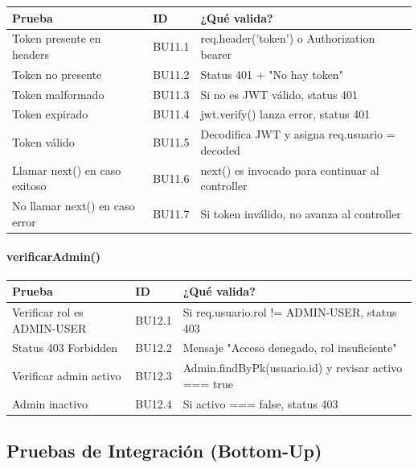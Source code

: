 \begin{table}[H]
\centering
\begin{tabular}{|l|l|p{6cm}|}
\hline
\textbf{Prueba} & \textbf{ID} & \textbf{¿Qué valida?} \\ \hline
Token presente en headers & BU11.1 & req.header('token') o Authorization bearer \\ \hline
Token no presente & BU11.2 & Status 401 + "No hay token" \\ \hline
Token malformado & BU11.3 & Si no es JWT válido, status 401 \\ \hline
Token expirado & BU11.4 & jwt.verify() lanza error, status 401 \\ \hline
Token válido & BU11.5 & Decodifica JWT y asigna req.usuario = decoded \\ \hline
Llamar next() en caso exitoso & BU11.6 & next() es invocado para continuar al controller \\ \hline
No llamar next() en caso error & BU11.7 & Si token inválido, no avanza al controller \\ \hline
\end{tabular}
\end{table}

\paragraph{verificarAdmin()}

\begin{table}[H]
\centering
\begin{tabular}{|l|l|p{6cm}|}
\hline
\textbf{Prueba} & \textbf{ID} & \textbf{¿Qué valida?} \\ \hline
Verificar rol es ADMIN-USER & BU12.1 & Si req.usuario.rol != ADMIN-USER, status 403 \\ \hline
Status 403 Forbidden & BU12.2 & Mensaje "Acceso denegado, rol insuficiente" \\ \hline
Verificar admin activo & BU12.3 & Admin.findByPk(usuario.id) y revisar activo === true \\ \hline
Admin inactivo & BU12.4 & Si activo === false, status 403 \\ \hline
\end{tabular}
\end{table}

\subsection{Pruebas de Integración (Bottom-Up)}

